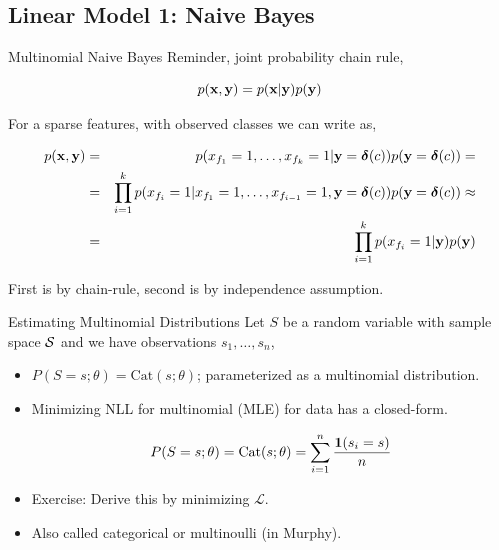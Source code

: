 \documentclass{beamer}
\begin{document}
\subsection{Linear Model 1: Naive Bayes}

\begin{frame}{Multinomial Naive Bayes } 
  Reminder, joint probability chain rule,  

  \[ p(\mathbf{x}, \mathbf{y}) = p(\mathbf{x} | \mathbf{y}) p(\mathbf{y}) \] 


    \pause
  For a sparse features, with observed classes we can write as,
  
  \begin{eqnarray*}
    p(\mathbf{x}, \mathbf{y}) &=& p(x_{f_1}=1, \ldots, x_{f_k}=1 | \mathbf{y}=\boldsymbol{\delta}(c) ) p(\mathbf{y}=\boldsymbol{\delta}(c)) =\\
     &=& \prod_{i=1}^k p(x_{f_i}=1 | x_{f_1}=1, \ldots, x_{f_{i-1}}=1, \mathbf{y}=\boldsymbol{\delta}(c)) p(\mathbf{y}=\boldsymbol{\delta}(c)) \approx \\
     &=& \prod_{i=1}^k p(x_{f_i} =1| \mathbf{y}) p(\mathbf{y})  
  \end{eqnarray*}

  
  First is by chain-rule, second is by independence assumption.


\end{frame}




\begin{frame}{Estimating Multinomial Distributions} 
  Let $S$ be a random variable with sample space $\mathcal{S}$ and 
  we have observations $s_1, \ldots, s_n$, 


  \begin{itemize}
  \item $P(S=s; \theta) = \mathrm{Cat} (s;\theta)$; parameterized as a multinomial distribution.
    \pause
  \item Minimizing NLL for multinomial (MLE) for data has a closed-form.

    \[ P(S=s; \theta) = \mathrm{Cat} (s;\theta) = \sum_{i=1}^n \frac{\mathbf{1}(s_i = s)}{n} \]

  \item Exercise: Derive this by minimizing $\mathcal{L}$. 

  \end{itemize}

  \begin{itemize}
  \item Also called categorical or multinoulli (in Murphy).
  \end{itemize}
\end{frame}
\end{document}
